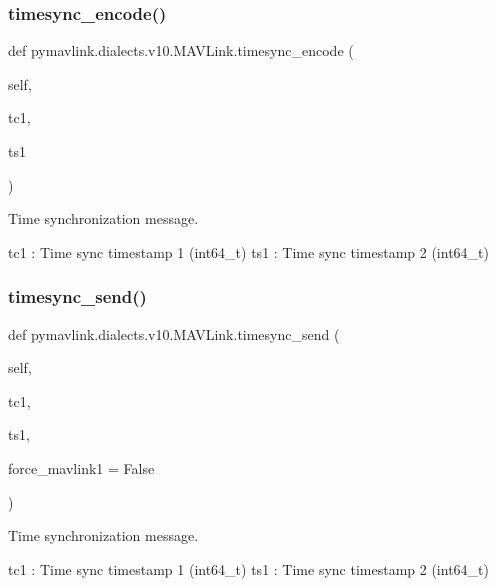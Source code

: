 \begin{DoxyVerb}
\begin{DoxyVerb}
\begin{DoxyVerb}
\begin{DoxyVerb}
\begin{DoxyVerb}
\begin{DoxyVerb}
\begin{DoxyVerb}
\begin{DoxyVerb}
\begin{DoxyVerb}
\begin{DoxyVerb}
\subsubsection{\texorpdfstring{timesync\+\_\+encode()}{timesync\_encode()}}
{\footnotesize\ttfamily def pymavlink.\+dialects.\+v10.\+M\+A\+V\+Link.\+timesync\+\_\+encode (\begin{DoxyParamCaption}\item[{}]{self,  }\item[{}]{tc1,  }\item[{}]{ts1 }\end{DoxyParamCaption})}

\begin{DoxyVerb}Time synchronization message.

tc1                       : Time sync timestamp 1 (int64_t)
ts1                       : Time sync timestamp 2 (int64_t)\end{DoxyVerb}
 \mbox{\label{classpymavlink_1_1dialects_1_1v10_1_1MAVLink_a8423566e5cab9696f4fcdbe954c9180c}} 
\subsubsection{\texorpdfstring{timesync\+\_\+send()}{timesync\_send()}}
{\footnotesize\ttfamily def pymavlink.\+dialects.\+v10.\+M\+A\+V\+Link.\+timesync\+\_\+send (\begin{DoxyParamCaption}\item[{}]{self,  }\item[{}]{tc1,  }\item[{}]{ts1,  }\item[{}]{force\+\_\+mavlink1 = {\ttfamily False} }\end{DoxyParamCaption})}

\begin{DoxyVerb}Time synchronization message.

tc1                       : Time sync timestamp 1 (int64_t)
ts1                       : Time sync timestamp 2 (int64_t)\end{DoxyVerb}
 \mbox{\label{classpymavlink_1_1dialects_1_1v10_1_1MAVLink_acccefc2e8c26c293e6ad99bfaa77f105}} 

\end{DoxyVerb}
\end{DoxyVerb}
\end{DoxyVerb}
\end{DoxyVerb}
\end{DoxyVerb}
\end{DoxyVerb}
\end{DoxyVerb}
\end{DoxyVerb}
\end{DoxyVerb}
\end{DoxyVerb}
